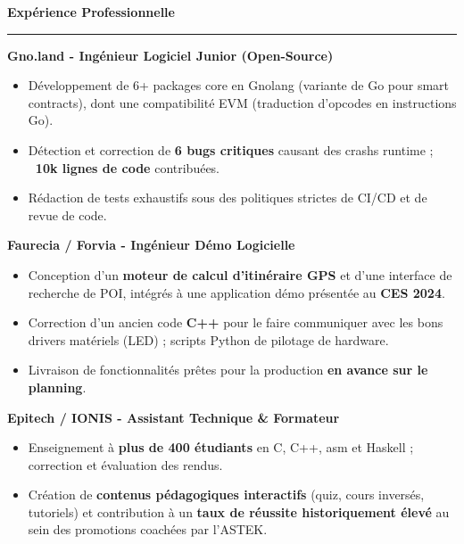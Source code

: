 \documentclass[9pt]{extarticle}
\begin{document}
\par\vspace{5pt}

{\large\bfseries Expérience Professionnelle}
\par\vspace{-8pt}
\rule{\linewidth}{0.4pt}
\par\vspace{5pt}

{\bfseries Gno.land - Ingénieur Logiciel Junior (Open-Source)}
\begin{itemize}[noitemsep, topsep=0pt]
	\item Développement de 6+ packages core en Gnolang (variante de Go pour smart contracts), dont une compatibilité EVM (traduction d'opcodes en instructions Go).
	\item Détection et correction de {\bfseries 6 bugs critiques} causant des crashs runtime ; {\bfseries ~10k lignes de code} contribuées.
	\item Rédaction de tests exhaustifs sous des politiques strictes de CI/CD et de revue de code.
\end{itemize}

\par\vspace{5pt}

{\bfseries Faurecia / Forvia - Ingénieur Démo Logicielle}
\begin{itemize}[noitemsep, topsep=0pt]
	\item Conception d'un {\bfseries moteur de calcul d'itinéraire GPS} et d'une interface de recherche de POI, intégrés à une application démo présentée au {\bfseries CES 2024}.
	\item Correction d'un ancien code {\bfseries C++} pour le faire communiquer avec les bons drivers matériels (LED) ; scripts Python de pilotage de hardware.
	\item Livraison de fonctionnalités prêtes pour la production {\bfseries en avance sur le planning}.
\end{itemize}

\par\vspace{5pt}

{\bfseries Epitech / IONIS - Assistant Technique \& Formateur}
\begin{itemize}[noitemsep, topsep=0pt]
	\item Enseignement à {\bfseries plus de 400 étudiants} en C, C++, asm et Haskell ; correction et évaluation des rendus.
	\item Création de {\bfseries contenus pédagogiques interactifs} (quiz, cours inversés, tutoriels) et contribution à un {\bfseries taux de réussite historiquement élevé} au sein des promotions coachées par l'ASTEK.
\end{itemize}
\end{document}
